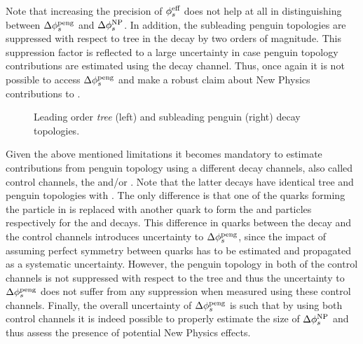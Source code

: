 \noindent Note that increasing the precision of $\phi_{s}^{\text {eff}}$ does not help at all in distinguishing
between $\Delta\phi_{s}^{\tiny\text{peng}}$ and $\Delta\phi_{s}^{\tiny \text{NP}}$. In addition, the subleading penguin
topologies are suppressed with respect to tree in the \BsJpsiPhi decay by two orders of magnitude.
This suppression factor is reflected to a large uncertainty in case penguin topology contributions
are estimated using the \BsJpsiPhi decay channel. Thus, once again it is not possible to
access $\Delta\phi_{s}^{\tiny\text{peng}}$ and make a robust claim about New Physics contributions to \phis.

\begin{figure}[t]
  \begin{subfigure}{0.5\textwidth}
    \raggedright
    {\scalebox{1}{\sffamily }}
    \label{app_jpsiphi_tree}
  \end{subfigure}%
  \hfill
  \begin{subfigure}{0.5\textwidth}
    \raggedleft
    {\scalebox{1}{\sffamily }}
    \label{app_jpsiphi_peng}
  \end{subfigure}
    \caption{Leading order {\it tree} (left) and subleading penguin (right) \BsJpsiPhi decay topologies.}
  \label{app_jpsiphi_tree_peng}
\end{figure}

Given the above mentioned limitations it becomes mandatory to estimate contributions from
penguin topology using a different decay channels, also called control channels,
\eg the \BsJpsiKst and/or \BdJpsiRho. Note that the latter decays have identical tree and penguin
topologies with \BsJpsiPhi. The only difference is that one of the quarks forming the \Pphi
particle in  is replaced with another quark to form the \Kstarz
and \rhoz particles respectively for the \BsJpsiKst and \BdJpsiRho decays. This difference in
quarks between the \BsJpsiPhi decay and the control channels introduces uncertainty to
$\Delta\phi_{s}^{\tiny\text{peng}}$, since the impact of assuming perfect symmetry between quarks has to be
estimated and propagated as a systematic uncertainty. However, the penguin topology in both of
the control channels is not suppressed with respect to the tree and thus the uncertainty to
$\Delta\phi_{s}^{\tiny\text{peng}}$ does not suffer from any suppression when measured using these control
channels. Finally, the overall uncertainty of $\Delta\phi_{s}^{\tiny\text{peng}}$ is such
that by using both control channels it is indeed possible to properly estimate the size of
$\Delta\phi_{s}^{\tiny \text{NP}}$ and thus assess the presence of potential New Physics effects.

